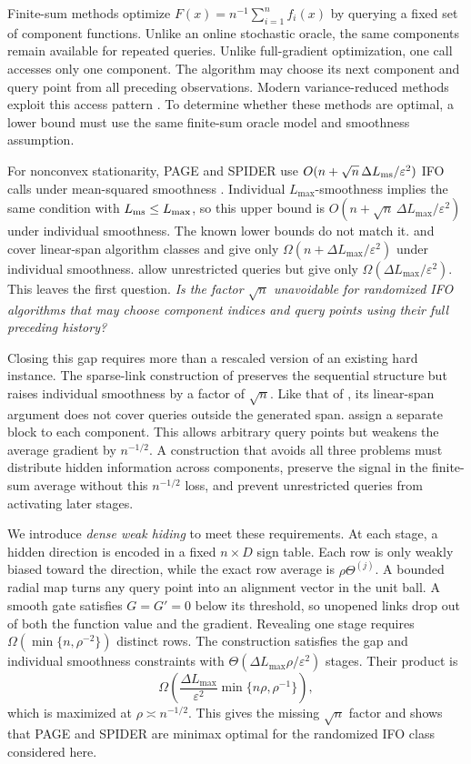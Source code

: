 \documentclass{article}
\theoremstyle{definition}
\begin{document}
Finite-sum methods optimize
$F(x)=n^{-1}\sum_{i=1}^n f_i(x)$ by querying a fixed set of component
functions.  Unlike an online stochastic oracle, the same components remain
available for repeated queries.  Unlike full-gradient optimization, one call
accesses only one component.  The algorithm may choose its next component and
query point from all preceding observations.  Modern
variance-reduced methods exploit this access pattern
\citep{defazio2014saga,fang2018spider,li2021page}.  To determine whether these
methods are optimal, a lower bound must use the same finite-sum oracle model
and smoothness assumption.

For nonconvex stationarity, PAGE and SPIDER use
$O(n+\sqrt n\,\Delta L_{\rm ms}/\varepsilon^2)$ IFO calls under mean-squared
smoothness \citep{fang2018spider,li2021page}.  Individual
$L_{\max}$-smoothness implies the same condition with
$L_{\rm ms}\le L_{\max}$, so this upper bound is
$O(n+\sqrt n\,\Delta L_{\max}/\varepsilon^2)$ under individual smoothness.
The known lower bounds do not match it.  \citet{zhou2019lower} and
\citet{han2024lower} cover linear-span algorithm classes and give only
$\Omega(n+\Delta L_{\max}/\varepsilon^2)$
under individual smoothness.  \citet{emmenegger2022oracle} allow unrestricted
queries but give only
$\Omega(\Delta L_{\max}/\varepsilon^2)$.  This leaves the first question.
\emph{Is the factor $\sqrt n$ unavoidable for randomized IFO algorithms that
may choose component indices and query points using their full preceding
history?}

Closing this gap requires more than a rescaled version of an existing hard
instance.  The sparse-link construction of \citet{zhou2019lower} preserves the
sequential structure but raises individual smoothness by a factor of $\sqrt n$.
Like that of \citet{han2024lower}, its linear-span argument does not cover queries
outside the generated span.  \citet{emmenegger2022oracle} assign a separate
block to each component.  This allows arbitrary query points but weakens the
average gradient by $n^{-1/2}$.  A construction that avoids all three problems
must distribute hidden information across components, preserve the signal in
the finite-sum average without this $n^{-1/2}$ loss, and prevent unrestricted
queries from activating later stages.

We introduce \emph{dense weak hiding} to meet these requirements.  At each
stage, a hidden direction is encoded in a fixed $n\times D$ sign table.  Each
row is only weakly biased toward the direction, while the exact row average is
$\rho\Theta^{(j)}$.  A bounded radial map turns any query point into an
alignment vector in the unit ball.  A smooth gate satisfies $G=G'=0$ below
its threshold, so unopened links drop out of both the function value and the
gradient.  Revealing one stage requires
$\Omega(\min\{n,\rho^{-2}\})$ distinct rows.  The construction satisfies the
gap and individual smoothness constraints with
$\Theta(\Delta L_{\max}\rho/\varepsilon^2)$ stages.  Their product is
\[
 \Omega\!\left(
 \frac{\Delta L_{\max}}{\varepsilon^2}
 \min\{n\rho,\rho^{-1}\}
 \right),
\]
which is maximized at $\rho\asymp n^{-1/2}$.  This gives the missing
$\sqrt n$ factor and shows that PAGE and SPIDER are minimax optimal for the
randomized IFO class considered here.
\end{document}
